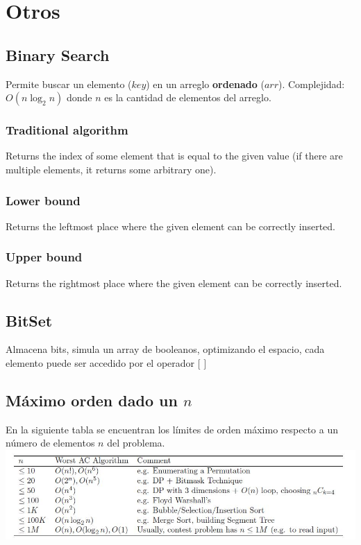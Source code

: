 \documentclass[10pt,letterpaper,twocolumn]{article}
\newcommand{\source}[1]{
	
	\dotfill
}
\begin{document}
\section{Otros}
	\subsection{Binary Search}
		Permite buscar un elemento ($key$) en un arreglo \textbf{ordenado} ($arr$).
		Complejidad: $O(n \log_2 n)$ donde $n$ es la cantidad de elementos del arreglo.\\
		\subsubsection{Traditional algorithm}
			Returns the index of some element that is equal to the given value (if there are multiple
			elements, it returns some arbitrary one).
			\source{./src/binary_search.cpp}
		\subsubsection{Lower bound}
			Returns the leftmost place where the given element can be correctly inserted.
			\source{./src/lower_bound.cpp}
		\subsubsection{Upper bound}
			Returns the rightmost place where the given element can be correctly inserted.
			\source{./src/upper_bound.cpp}
	\subsection{BitSet}
		Almacena bits, simula un array de booleanos, optimizando el espacio, cada elemento puede ser accedido por el operador $[$ $]$\\
		\source{./src/bitset.cpp}
	\subsection{Máximo orden dado un $n$}
		En la siguiente tabla se encuentran los límites de orden máximo respecto a un número de elementos $n$ del problema.\\
		\includegraphics[scale=0.5]{./src/maxorder.jpg}
\end{document}
